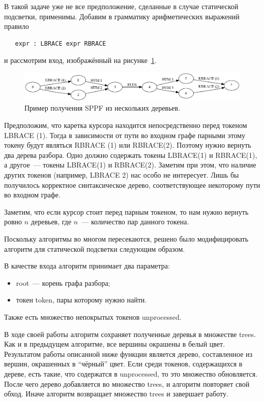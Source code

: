 В такой задаче уже не все предположение, сделанные в случае статической подсветки, применимы. Добавим в грамматику арифметических выражений правило 

\begin{verbatim}
   expr : LBRACE expr RBRACE
\end{verbatim}

и рассмотрим вход, изображённый на рисунке~\ref{dynamic_input}. 

\begin{figure}[t]
\centering
\includegraphics[width=\linewidth]{Ivanov/Pictures/dynamic_input.png}
\caption{Пример получения SPPF из нескольких деревьев.}
\label{dynamic_input}
\end{figure}

Предположим, что каретка курсора находится непосредственно перед токеном LBRACE (1). Тогда в зависимости от пути во входном графе парными этому токену будут являться RBRACE (1) или RBRACE(2). Поэтому нужно вернуть два дерева разбора. Одно должно содержать токены LBRACE(1) и RBRACE(1), а другое~--- токены LBRACE(1) и RBRACE(2). Заметим при этом, что наличие других токенов (например, LBRACE 2) нас особо не интересует. Лишь бы получилось корректное синтаксическое дерево, соответствующее некоторому пути во входном графе.

Заметим, что если курсор стоит перед парным токеном, то нам нужно вернуть ровно $n$ деревьев, где $n$~--- количество пар данного токена. 

Поскольку алгоритмы во многом пересекаются, решено было модифицировать алгоритм для статической подсветки следующим образом. 

В качестве входа алгоритм принимает два параметра:
\begin{itemize}
\item root~--- корень графа разбора;
\item токен token, пары которому нужно найти.
\end{itemize}

Также есть множество непокрытых токенов unprocessed.

В ходе своей работы алгоритм сохраняет полученные деревья в множестве trees. Как и в предыдущем алгоритме, все вершины окрашены в белый цвет. Результатом работы описанной ниже функции является дерево, составленное из вершин, окрашенных в ``чёрный'' цвет. Если среди токенов, содержащихся в дереве, есть такие, что содержатся в unprocessed, то это множество обновляется. После чего дерево добавляется во множество trees, и алгоритм повторяет свой обход. Иначе алгоритм возвращает множество trees и завершает работу. 

